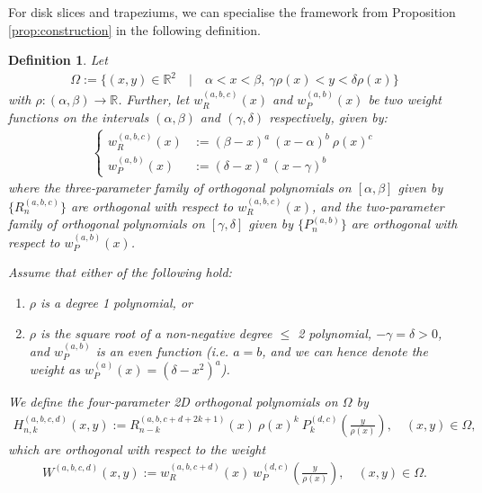\documentclass[11pt, oneside]{article}   	%
\newcommand{\R}{\mathbb{R}}
\newcommand{\hdop}{H}
\newcommand{\hdopnk}{\hdop_{n,k}}
\newcommand{\genjac}{R}
\newcommand{\genjacnmk}{\genjac_{n-k}}
\newcommand{\genjacw}{w_\genjac}
\newtheorem{definition}{Definition}
\begin{document}
For disk slices and trapeziums, we can specialise the framework from Proposition \ref{prop:construction} in the following definition.
\begin{definition}\label{def:construction}
Let
\begin{align*}
	\Omega := \{(x,y) \in \R^2 \quad | \quad \alpha < x < \beta, \: \gamma \rho(x) < y < \delta \rho(x)\}
\end{align*}
with $\rho : (\alpha, \beta) \to \R$. Further, let $\genjacw^{(a,b,c)}(x)$ and $w^{(a,b)}_P(x)$ be two weight functions on the intervals $(\alpha, \beta)$ and $(\gamma, \delta)$ respectively, given by:
\begin{align*}
\begin{cases}
\genjacw^{(a,b,c)}(x) &:= (\beta - x)^a \: (x - \alpha)^{b} \: \rho(x)^{c} \\
w^{(a,b)}_P(x) &:= (\delta-x)^a \: (x - \gamma)^b
\end{cases}
\end{align*}
where the three-parameter family of orthogonal polynomials on $[\alpha,\beta]$ given by $\{\genjac_n^{(a,b,c)}\}$ are orthogonal with respect to $\genjacw^{(a,b,c)}(x)$, and the two-parameter family of orthogonal polynomials on $[\gamma,\delta]$ given by $\{P_n^{(a,b)}\}$ are orthogonal with respect to $w^{(a,b)}_P(x)$.

Assume that either of the following hold:
\begin{enumerate}
\item  \(\rho\) is a degree 1 polynomial, or 
\item \(\rho\) is the square root of a non-negative degree \(\le\) 2 polynomial, \(-\gamma = \delta > 0\), and \(w^{(a,b)}_P\) is an even function (i.e. $a = b$, and we can hence denote the weight as $w^{(a)}_P(x) = (\delta-x^2)^a$).
\end{enumerate}
We define the four-parameter 2D orthogonal polynomials on $\Omega$ by
\begin{align*}
	\hdopnk^{(a,b,c,d)}(x,y) := \genjacnmk^{(a, b, c+d+2k+1)}(x) \: \rho(x)^k \: P_k^{(d,c)}(\frac{y}{\rho(x)}), \quad (x,y) \in \Omega, 
\end{align*}
which are orthogonal with respect to the weight
\begin{align*}
	W^{(a,b,c,d)}(x,y) := \genjacw^{(a,b,c+d)}(x) \: w_P^{(d,c)}(\frac{y}{\rho(x)}), \quad (x,y) \in \Omega. 
\end{align*}
\end{definition}
\end{document}

